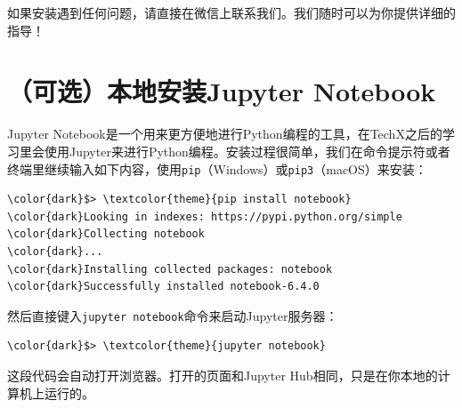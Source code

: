 \documentclass{article}
\begin{document}
如果安装遇到任何问题，请直接在微信上联系我们。我们随时可以为你提供详细的指导！

\section{（可选）本地安装Jupyter Notebook}
Jupyter Notebook是一个用来更方便地进行Python编程的工具，在TechX之后的学习里会使用Jupyter来进行Python编程。安装过程很简单，我们在命令提示符或者终端里继续输入如下内容，使用\texttt{pip}（Windows）或\texttt{pip3}（macOS）来安装：
\begin{Verbatim}[commandchars=\\\{\},xleftmargin=1.5cm]
\color{dark}$> \textcolor{theme}{pip install notebook}
\color{dark}Looking in indexes: https://pypi.python.org/simple
\color{dark}Collecting notebook
\color{dark}...
\color{dark}Installing collected packages: notebook
\color{dark}Successfully installed notebook-6.4.0
\end{Verbatim}

然后直接键入\texttt{jupyter notebook}命令来启动Jupyter服务器：
\begin{Verbatim}[commandchars=\\\{\},xleftmargin=1.5cm]
\color{dark}$> \textcolor{theme}{jupyter notebook}
\end{Verbatim}

这段代码会自动打开浏览器。打开的页面和Jupyter Hub相同，只是在你本地的计算机上运行的。
\end{document}

